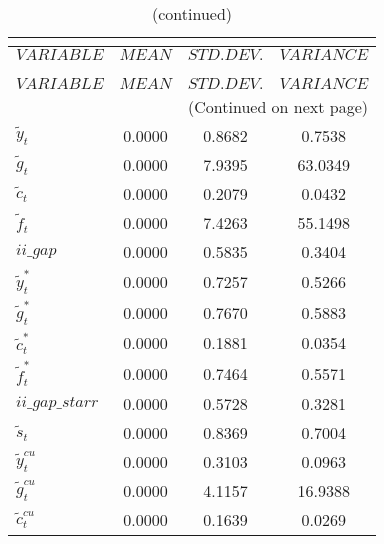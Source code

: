 
\begin{center}
\begin{longtable}{lccc} 
\caption{THEORETICAL MOMENTS}\\
 \label{Table:th_moments}\\
\toprule 
$VARIABLE                 $	 & 	 $         MEAN$	 & 	 $    STD. DEV.$	 & 	 $     VARIANCE$\\
\midrule \endfirsthead 
\caption{(continued)}\\
 \toprule \\ 
$VARIABLE                 $	 & 	 $         MEAN$	 & 	 $    STD. DEV.$	 & 	 $     VARIANCE$\\
\midrule \endhead 
\midrule \multicolumn{4}{r}{(Continued on next page)} \\ \bottomrule \endfoot 
\bottomrule \endlastfoot 
${\tilde y_t}             $	 & 	       0.0000	 & 	       0.8682	 & 	       0.7538 \\ 
${\tilde g_t}             $	 & 	       0.0000	 & 	       7.9395	 & 	      63.0349 \\ 
${\tilde c_t}             $	 & 	       0.0000	 & 	       0.2079	 & 	       0.0432 \\ 
${\tilde f_t}             $	 & 	       0.0000	 & 	       7.4263	 & 	      55.1498 \\ 
$ii\_gap                  $	 & 	       0.0000	 & 	       0.5835	 & 	       0.3404 \\ 
${\tilde y_t^*}           $	 & 	       0.0000	 & 	       0.7257	 & 	       0.5266 \\ 
${\tilde g_t^*}           $	 & 	       0.0000	 & 	       0.7670	 & 	       0.5883 \\ 
${\tilde c_t^*}           $	 & 	       0.0000	 & 	       0.1881	 & 	       0.0354 \\ 
${\tilde f_t^*}           $	 & 	       0.0000	 & 	       0.7464	 & 	       0.5571 \\ 
$ii\_gap\_starr           $	 & 	       0.0000	 & 	       0.5728	 & 	       0.3281 \\ 
${\tilde s_t}             $	 & 	       0.0000	 & 	       0.8369	 & 	       0.7004 \\ 
${\tilde y_t^{cu}}        $	 & 	       0.0000	 & 	       0.3103	 & 	       0.0963 \\ 
${\tilde g_t^{cu}}        $	 & 	       0.0000	 & 	       4.1157	 & 	      16.9388 \\ 
${\tilde c_t^{cu}}        $	 & 	       0.0000	 & 	       0.1639	 & 	       0.0269 \\ 

\end{longtable}
\end{center}
